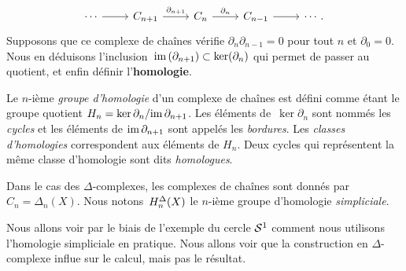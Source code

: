 \[\begin{tikzcd}
\cdots\arrow[r]& C_{n+1}\arrow[r, "\partial_{n+1}"]&C_n\arrow[r,"\partial_n"]&C_{n-1}\arrow[r] & \cdots.
\end{tikzcd}\]
Supposons que ce complexe de chaînes vérifie $\partial_n\partial_{n-1}=0$ pour tout $n$ et $\partial_0=0$. Nous en déduisons l'inclusion~$\mathrm{im}\,(\partial_{n+1})\subset\ker(\partial_n)$ qui permet de passer au quotient, et enfin définir l'\textbf{homologie}.

\begin{definition}\label{def:homology}
Le $n$-ième \emph{groupe d'homologie} d'un complexe de chaînes est défini comme étant le groupe quotient $H_n=\ker\partial_n/\mathrm{im}\,\partial_{n+1}$. Les éléments de~$\ker\partial_n$ sont nommés les \emph{cycles} et les éléments de $\mathrm{im}\,\partial_{n+1}$ sont appelés les \emph{bordures}. Les \emph{classes d'homologies} correspondent aux éléments de $H_n$. Deux cycles qui représentent la même classe d'homologie sont dits \emph{homologues}.
\end{definition}

Dans le cas des $\Delta$-complexes, les complexes de chaînes sont donnés par $C_n=\Delta_n(X)$. Nous notons~$H^\Delta_n(X)$ le $n$-ième groupe d'homologie \emph{simpliciale}. 

Nous allons voir par le biais de l'exemple du cercle $\mathcal{S}^{1}$ comment nous utilisons l'homologie simpliciale en pratique. Nous allons voir que la construction en $\Delta$-complexe influe sur le calcul, mais pas le résultat.

